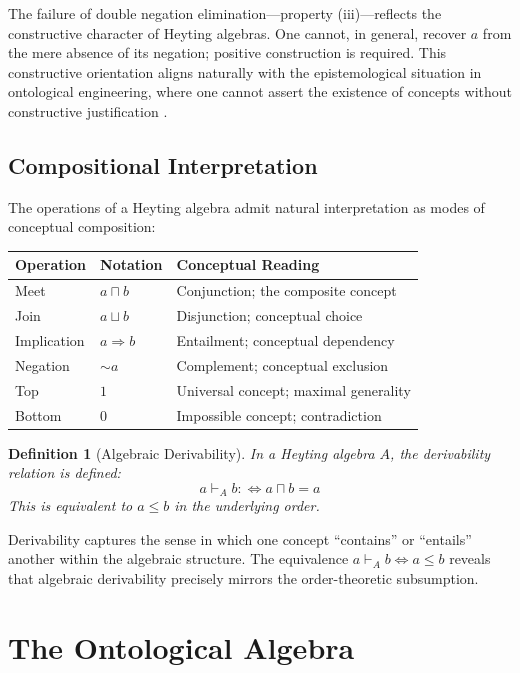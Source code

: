 \documentclass[12pt,a4paper]{article}
\newtheorem{definition}{Definition}[section]
\begin{document}
The failure of double negation elimination---property (iii)---reflects the constructive character of Heyting algebras. One cannot, in general, recover $a$ from the mere absence of its negation; positive construction is required. This constructive orientation aligns naturally with the epistemological situation in ontological engineering, where one cannot assert the existence of concepts without constructive justification \citep[cf.][]{sorensen2006}.

\subsection{Compositional Interpretation}

The operations of a Heyting algebra admit natural interpretation as modes of conceptual composition:

\begin{center}
\renewcommand{\arraystretch}{1.3}
\begin{tabular}{lll}
\textbf{Operation} & \textbf{Notation} & \textbf{Conceptual Reading}\\
\hline
Meet & $a \sqcap b$ & Conjunction; the composite concept\\
Join & $a \sqcup b$ & Disjunction; conceptual choice\\
Implication & $a \Rightarrow b$ & Entailment; conceptual dependency\\
Negation & $\sim a$ & Complement; conceptual exclusion\\
Top & $1$ & Universal concept; maximal generality\\
Bottom & $0$ & Impossible concept; contradiction
\end{tabular}
\end{center}

\begin{definition}[Algebraic Derivability]
In a Heyting algebra $A$, the \emph{derivability relation} is defined:
$$
a \vdash_A b :\iff a \sqcap b = a
$$
This is equivalent to $a \leq b$ in the underlying order.
\end{definition}

Derivability captures the sense in which one concept ``contains'' or ``entails'' another within the algebraic structure. The equivalence $a \vdash_A b \iff a \leq b$ reveals that algebraic derivability precisely mirrors the order-theoretic subsumption.

\section{The Ontological Algebra}
\end{document}
